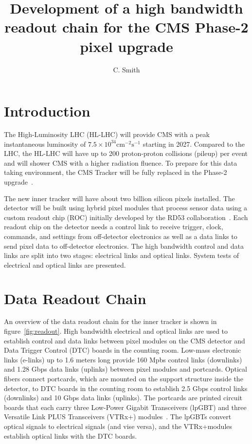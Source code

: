 \documentclass[a4paper,11pt]{article}
\title{Development of a high bandwidth readout chain for the CMS Phase-2 pixel upgrade}
\author{C. Smith}
\affiliation{The University of Kansas,\\Lawrence, Kansas 66045, USA}
\newcommand{\vtrxp}{VTRx+}
\begin{document}
\maketitle
\flushbottom


\section{Introduction}
\label{sec:introduction}

The High-Luminosity LHC (HL-LHC) will provide CMS with a peak instantaneous luminosity of $7.5 \times 10^{34} \mathrm{cm}^{-2} \mathrm{s}^{-1}$ starting in 2027.
Compared to the LHC, the HL-LHC will have up to 200 proton-proton collisions (pileup) per event and will shower CMS with a higher radiation fluence.
To prepare for this data taking environment, the CMS Tracker will be fully replaced in the Phase-2 upgrade~\cite{ref:tdr,ref:orfanelli}.

The new inner tracker will have about two billion silicon pixels installed.
The detector will be built using hybrid pixel modules that process sensor data using a custom readout chip (ROC) initially developed by the RD53 collaboration~\cite{ref:rd53}.
Each readout chip on the detector needs a control link to receive trigger, clock, commands, and settings from off-detector electronics as well as a data links to send pixel data to off-detector electronics.
The high bandwidth control and data links are split into two stages: electrical links and optical links.
System tests of electrical and optical links are presented.

\section{Data Readout Chain}
\label{sec:readout}

An overview of the data readout chain for the inner tracker is shown in figure~\ref{fig:readout}.
High bandwidth electrical and optical links are used to establish control and data links between pixel modules on the CMS detector and Data Trigger Control (DTC) boards in the counting room.
Low-mass electronic links (e-links) up to 1.6 meters long provide 160 Mpbs control links (downlinks) and 1.28 Gbps data links (uplinks) between pixel modules and portcards.
Optical fibers connect portcards, which are mounted on the support structure inside the detector, to DTC boards in the counting room to establish 2.5 Gbps control links (downlinks) and 10 Gbps data links (uplinks).
The portcards are printed circuit boards that each carry three Low-Power Gigabit Transceivers (lpGBT) and three Versatile Link PLUS Transceivers (\vtrxp) modules~\cite{ref:lpgbt,ref:vtrxp}.
The lpGBTs convert optical signals to electrical signals (and vise versa), and the \vtrxp\space modules establish optical links with the DTC boards.
\end{document}
